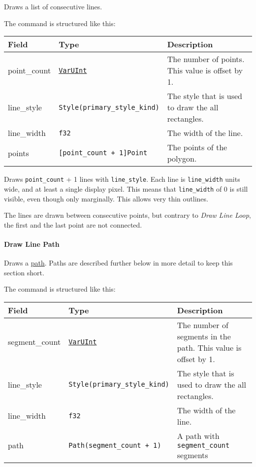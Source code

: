 \documentclass[
]{article}
\begin{document}
Draws a list of consecutive lines.

The command is structured like this:

\begin{longtable}[]{@{}lll@{}}
\toprule
Field & Type & Description \\
\midrule
\endhead
point\_count & \protect\hyperlink{varuint}{\texttt{VarUInt}} & The
number of points. This value is offset by 1. \\
line\_style & \texttt{Style(primary\_style\_kind)} & The style that is
used to draw the all rectangles. \\
line\_width & \texttt{f32} & The width of the line. \\
points & \texttt{{[}point\_count\ +\ 1{]}Point} & The points of the
polygon. \\
\bottomrule
\end{longtable}

Draws \texttt{point\_count} + 1 lines with \texttt{line\_style}. Each
line is \texttt{line\_width} units wide, and at least a single display
pixel. This means that \texttt{line\_width} of 0 is still visible, even
though only marginally. This allows very thin outlines.

The lines are drawn between consecutive points, but contrary to
\emph{Draw Line Loop}, the first and the last point are not connected.

\hypertarget{draw-line-path}{%
\paragraph{Draw Line Path}\label{draw-line-path}}

Draws a \protect\hyperlink{path}{path}. Paths are described further
below in more detail to keep this section short.

The command is structured like this:

\begin{longtable}[]{@{}lll@{}}
\toprule
Field & Type & Description \\
\midrule
\endhead
segment\_count & \protect\hyperlink{varuint}{\texttt{VarUInt}} & The
number of segments in the path. This value is offset by 1. \\
line\_style & \texttt{Style(primary\_style\_kind)} & The style that is
used to draw the all rectangles. \\
line\_width & \texttt{f32} & The width of the line. \\
path & \texttt{Path(segment\_count\ +\ 1)} & A path with
\texttt{segment\_count} segments \\
\bottomrule
\end{longtable}
\end{document}
